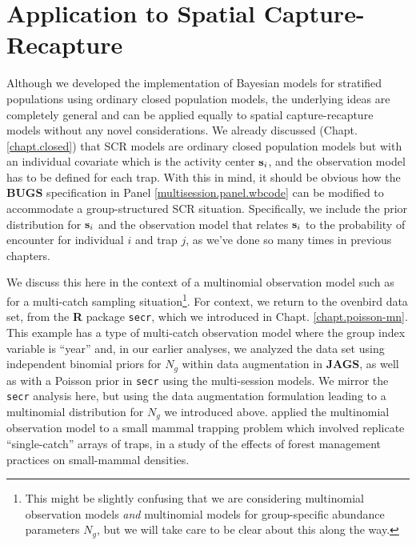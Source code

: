 \section{Application to Spatial Capture-Recapture}

Although we developed the implementation of Bayesian models for
stratified populations using ordinary closed population models, the
underlying ideas are completely general and can be applied equally to
spatial capture-recapture models without any novel considerations.  We
already discussed (Chapt. \ref{chapt.closed}) that SCR models are
ordinary closed population models but with an individual covariate
which is the activity center ${\bf s}_{i}$, and the observation model
has to be defined for each trap. With this in mind, it should be
obvious how the {\bf BUGS} specification in Panel
\ref{multisession.panel.wbcode} can be modified to accommodate a
group-structured SCR situation.  Specifically, we include the prior
distribution for ${\bf s}_{i}$ and the observation model that relates
${\bf s}_{i}$ to the probability of encounter for individual $i$ and
trap $j$, as we've done so many times in previous chapters.

We discuss this here in the context of a multinomial observation model
such as for a multi-catch sampling situation\footnote{This might be
  slightly confusing that we are considering multinomial observation
  models {\it and} multinomial models for group-specific abundance
  parameters $N_{g}$, but we will take care to be clear about this
  along the way.}.  For context, we return to the ovenbird data set,
from the {\bf R} package \mbox{\tt secr}, which we introduced in
Chapt. \ref{chapt.poisson-mn}. This example has a type of multi-catch
observation model where the group index variable is ``year'' and, in
our earlier analyses, we analyzed the data set using independent
binomial priors for $N_{g}$ within data augmentation in {\bf JAGS}, as
well as with a Poisson prior in \mbox{\tt secr} using the
multi-session models.  We mirror the \mbox{\tt secr} analysis here,
but using the data augmentation formulation leading to a multinomial
distribution for $N_{g}$ we introduced above.
\citet{royle_converse:2013} applied the multinomial observation model
to a small mammal trapping problem which involved replicate
``single-catch'' arrays of traps, in a study of the effects of forest
management practices on small-mammal densities.

